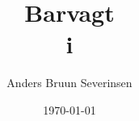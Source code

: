 

\title{Barvagt\\ i \fredagscafeen}
\date{\today}
\author{Anders Bruun Severinsen}



\maketitle

\tableofcontents











\printindex


